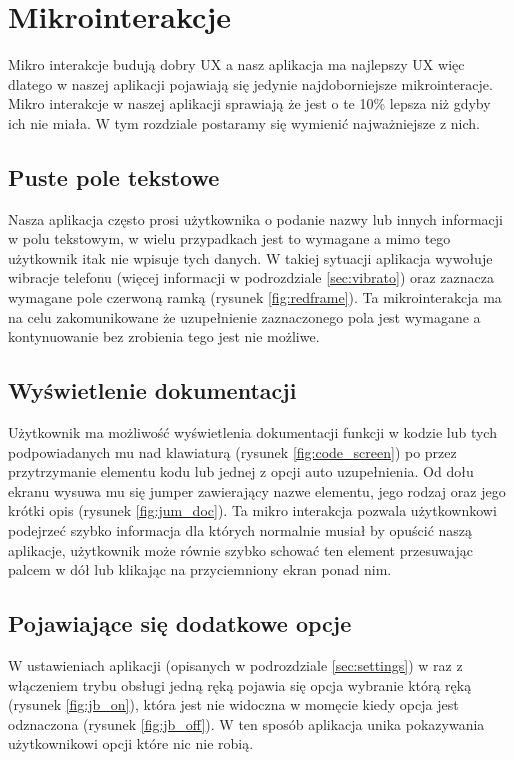 \chapter{Mikrointerakcje}
Mikro interakcje budują dobry UX a nasz aplikacja ma najlepszy UX więc dlatego w naszej aplikacji pojawiają się jedynie najdoborniejsze mikrointeracje. Mikro interakcje w naszej aplikacji sprawiają że jest o te 10\% lepsza niż gdyby ich nie miała. W tym rozdziale postaramy się wymienić najważniejsze z nich.

\section{Puste pole tekstowe}
Nasza aplikacja często prosi użytkownika o podanie nazwy lub innych informacji w polu tekstowym, w wielu przypadkach jest to wymagane a mimo tego użytkownik itak nie wpisuje tych danych. W takiej sytuacji aplikacja wywołuje wibracje telefonu (więcej informacji w podrozdziale \ref{sec:vibrato}) oraz zaznacza wymagane pole czerwoną ramką (rysunek \ref{fig:redframe}).
\newline\newline
Ta mikrointerakcja ma na celu zakomunikowane że uzupełnienie zaznaczonego pola jest wymagane a kontynuowanie bez zrobienia tego jest nie możliwe.

\section{Wyświetlenie dokumentacji}
Użytkownik ma możliwość wyświetlenia dokumentacji funkcji w kodzie lub tych podpowiadanych mu nad klawiaturą (rysunek \ref{fig:code_screen}) po przez przytrzymanie elementu kodu lub jednej z opcji auto uzupełnienia. Od dołu ekranu wysuwa mu się jumper zawierający nazwe elementu, jego rodzaj oraz jego krótki opis (rysunek \ref{fig:jum_doc}).
\newline\newline
Ta mikro interakcja pozwala użytkownkowi podejrzeć szybko informacja dla których normalnie musiał by opuścić naszą aplikacje, użytkownik może równie szybko schować ten element przesuwając palcem w dół lub klikając na przyciemniony ekran ponad nim.
\section{Pojawiające się dodatkowe opcje}
W ustawieniach aplikacji (opisanych w podrozdziale \ref{sec:settings}) w raz z włączeniem trybu obsługi jedną ręką pojawia się opcja wybranie którą ręką (rysunek \ref{fig:jb_on}), która jest nie widoczna w momęcie kiedy opcja jest odznaczona (rysunek \ref{fig:jb_off}). W ten sposób aplikacja unika pokazywania użytkownikowi opcji które nic nie robią.
